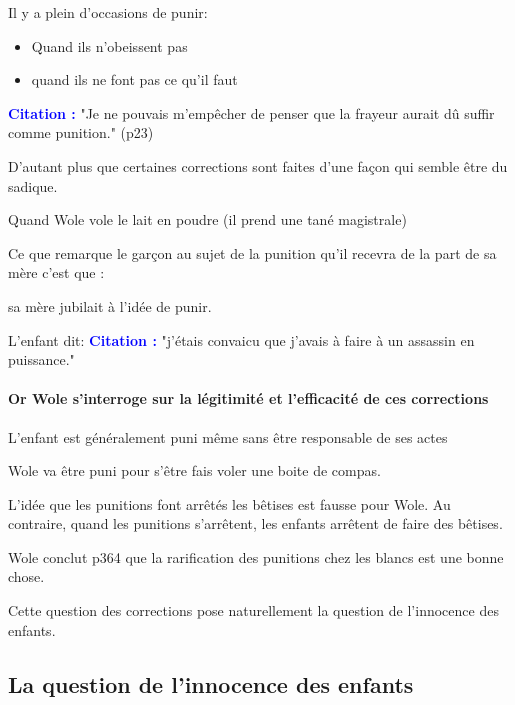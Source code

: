 \documentclass[a4paper, 11pt, hidelinks]{article}
\newcommand{\bs}{\bigskip}
\newcommand{\cit}{\large \textcolor{blue}{\textbf{Citation :}} \large }
\begin{document}
\bs

Il y a plein d'occasions de punir: 
\begin{itemize}
    \item Quand ils n'obeissent pas
    \item quand ils ne font pas ce qu'il faut
\end{itemize}

\bs

\cit "Je ne pouvais m'empêcher de penser que la frayeur aurait dû suffir comme punition." (p23) 

\bs

D'autant plus que certaines corrections sont faites d'une façon qui semble être du sadique.

Quand Wole vole le lait en poudre (il prend une tané magistrale)

Ce que remarque le garçon au sujet de la punition qu'il recevra de la part de sa mère c'est que :

sa mère jubilait à l'idée de punir.


L'enfant dit:
\cit "j'étais convaicu que j'avais à faire à un assassin en puissance." 






\paragraph{Or Wole s'interroge sur la légitimité et l'efficacité de ces corrections}


L'enfant est généralement puni même sans être responsable de ses actes


Wole va être puni pour s'être fais voler une boite de compas.

\bs

L'idée que les punitions font arrêtés les bêtises est fausse pour Wole. Au contraire, quand les punitions s'arrêtent,
les enfants arrêtent de faire des bêtises.

Wole conclut p364 que la rarification des punitions chez les blancs est une bonne chose.

\bs

Cette question des corrections pose naturellement la question de l'innocence des enfants.



\subsection{La question de l'innocence des enfants}
\end{document}
